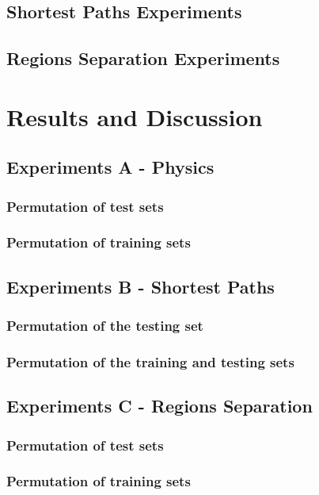 \subsection{Shortest Paths Experiments}


\subsection{Regions Separation Experiments}



\section{Results and Discussion}


\subsection{Experiments A - Physics}

\subsubsection {Permutation of test sets}

\subsubsection {Permutation of training sets}


\subsection{Experiments B - Shortest Paths}

\subsubsection {Permutation of the testing set}

\subsubsection {Permutation of the training and testing sets}


\subsection{Experiments C - Regions Separation}

\subsubsection {Permutation of test sets}

\subsubsection {Permutation of training sets}